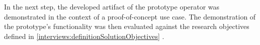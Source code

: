 In the next step, the developed artifact of the prototype operator was
demonstrated in the context of a proof-of-concept use case.
The demonstration of the prototype's functionality was then evaluated against
the research objectives defined in
\ref{interviews:definitionSolutionObjectives} .














%
%
%
%
%
%
%
